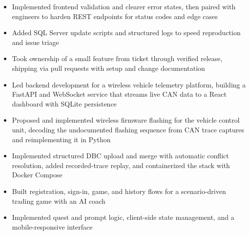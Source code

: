 \documentclass[10pt,letterpaper]{article}
\begin{document}
\entryspace

\begin{itemize}
  \item Implemented frontend validation and clearer error states, then paired with engineers to harden REST endpoints for status codes and edge cases
  \item Added SQL Server update scripts and structured logs to speed reproduction and issue triage
  \item Took ownership of a small feature from ticket through verified release, shipping via pull requests with setup and change documentation
\end{itemize}


\begin{itemize}
  \item Led backend development for a wireless vehicle telemetry platform, building a FastAPI and WebSocket service that streams live CAN data to a React dashboard with SQLite persistence
  \item Proposed and implemented wireless firmware flashing for the vehicle control unit, decoding the undocumented flashing sequence from CAN trace captures and reimplementing it in Python
  \item Implemented structured DBC upload and merge with automatic conflict resolution, added recorded-trace replay, and containerized the stack with Docker Compose
\end{itemize}

\entryspace

\begin{itemize}
  \item Built registration, sign-in, game, and history flows for a scenario-driven trading game with an AI coach
  \item Implemented quest and prompt logic, client-side state management, and a mobile-responsive interface
\end{itemize}
\end{document}

